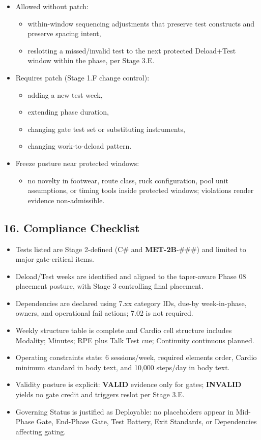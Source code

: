 \documentclass[10pt]{article}
\begin{document}
\begin{itemize}
\item Allowed without patch:
  \begin{itemize}
  \item within-window sequencing adjustments that preserve test constructs and preserve spacing intent,
  \item reslotting a missed/invalid test to the next protected Deload+Test window within the phase, per Stage 3.E.
  \end{itemize}
\item Requires patch (Stage 1.F change control):
  \begin{itemize}
  \item adding a new test week,
  \item extending phase duration,
  \item changing gate test set or substituting instruments,
  \item changing work-to-deload pattern.
  \end{itemize}
\item Freeze posture near protected windows:
  \begin{itemize}
  \item no novelty in footwear, route class, ruck configuration, pool unit assumptions, or timing tools inside protected windows; violations render evidence non-admissible.
  \end{itemize}
\end{itemize}

\subsection*{16. Compliance Checklist}


\begin{itemize}
\item Tests listed are Stage 2-defined (C\# and \textbf{MET-2B}-\#\#\#) and limited to major gate-critical items.
\item Deload/Test weeks are identified and aligned to the taper-aware Phase 08 placement posture, with Stage 3 controlling final placement.
\item Dependencies are declared using 7.xx category IDs, due-by week-in-phase, owners, and operational fail actions; 7.02 is not required.
\item Weekly structure table is complete and Cardio cell structure includes Modality; Minutes; RPE plus Talk Test cue; Continuity continuous planned.
\item Operating constraints state: 6 sessions/week, required elements order, Cardio minimum standard in body text, and 10,000 steps/day in body text.
\item Validity posture is explicit: \textbf{VALID} evidence only for gates; \textbf{INVALID} yields no gate credit and triggers reslot per Stage 3.E.
\item Governing Status is justified as Deployable: no placeholders appear in Mid-Phase Gate, End-Phase Gate, Test Battery, Exit Standards, or Dependencies affecting gating.
\end{itemize}
\end{document}
